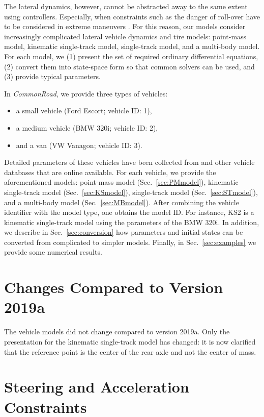 \documentclass[11pt,a4paper]{article}
\renewcommand{\^}[1]{^{(#1)}}
\begin{document}
The lateral dynamics, however, cannot be abstracted away to the same extent using controllers. Especially, when constraints such as the danger of roll-over have to be considered in extreme maneuvers \cite{Odenthal1999, Gaspar2005}. For this reason, our models consider increasingly complicated lateral vehicle dynamics and tire models: point-mass model, kinematic single-track model, single-track model, and a multi-body model. For each model, we (1) present the set of required ordinary differential equations, (2) convert them into state-space form so that common solvers can be used, and (3) provide typical parameters.

In \textit{CommonRoad}, we provide three types of vehicles: 
\begin{itemize}
 \item a small vehicle (Ford Escort; vehicle ID: 1), 
 \item a medium vehicle (BMW 320i; vehicle ID: 2), 
 \item and a van (VW Vanagon; vehicle ID: 3).
\end{itemize}
Detailed parameters of these vehicles have been collected from \cite[Appendix A]{Allen1992} and other vehicle databases that are online available. For each vehicle, we provide the aforementioned models: point-mass model (Sec.~\ref{sec:PMmodel}), kinematic single-track model (Sec.~\ref{sec:KSmodel}), single-track model (Sec.~\ref{sec:STmodel}), and a multi-body model (Sec.~\ref{sec:MBmodel}). After combining the vehicle identifier with the model type, one obtains the model ID. For instance, KS2 is a kinematic single-track model using the parameters of the BMW 320i. In addition, we describe in Sec.~\ref{sec:conversion} how parameters and initial states can be converted from complicated to simpler models. Finally, in Sec.~\ref{sec:examples} we provide some numerical results.

\section{Changes Compared to Version 2019a}

The vehicle models did not change compared to version 2019a. Only the presentation for the kinematic single-track model has changed: it is now clarified that the reference point is the center of the rear axle and not the center of mass.

\section{Steering and Acceleration Constraints} \label{sec:constraints}
\end{document}
